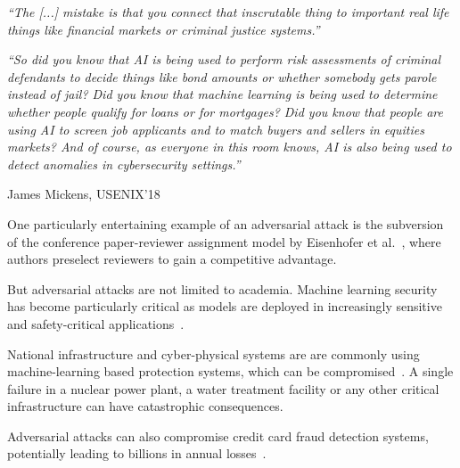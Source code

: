 \documentclass[a4paper, oneside]{discothesis}
\begin{document}
\begin{quotebox}
	\begin{flushright}
		\textit{``The [...] mistake is that you connect that inscrutable thing to important real life things like financial markets or criminal justice systems.''}
		\vspace{1em}

		\textit{``So did you know that AI is being used to perform risk assessments of criminal defendants to decide things like bond amounts or whether somebody gets parole instead of jail? Did you know that machine learning is being used to determine whether people qualify for loans or for mortgages? Did you know that people are using AI to screen job applicants and to match buyers and sellers in equities markets? And of course, as everyone in this room knows, AI is also being used to detect anomalies in cybersecurity settings.''}
		\vspace{1em}

		\textemdash{} James Mickens, USENIX'18~\cite{218395}
	\end{flushright}
\end{quotebox}

One particularly entertaining example of an adversarial attack is the subversion of the conference paper-reviewer assignment model by Eisenhofer et al.~\cite{eisenhofer2023no}, where authors preselect reviewers to gain a competitive advantage.

But adversarial attacks are not limited to academia. Machine learning security has become particularly critical as models are deployed in increasingly sensitive and safety-critical applications~\cite{10585001, ifci2023AnalysisOT, 9099439, Khadka2022ResilientML, yilmaz2021privacy, apruzzese2023real, kumar2020legal, Cao2020HateGANAG, Nurseitov2022ApplicationOM, Zolotukhin2022AttacksAM, huggingface2024security}.

National infrastructure and cyber-physical systems are are commonly using machine-learning based protection systems, which can be compromised~\cite{Moradpoor2023TheTO, Chevardin2023AnalysisOA, Ulybyshev2021TrustworthyDA, Halak2022TowardsAP, Rudolph2008DevelopingPS}. A single failure in a nuclear power plant, a water treatment facility or any other critical infrastructure can have catastrophic consequences.

Adversarial attacks can also compromise credit card fraud detection systems, potentially leading to billions in annual losses~\cite{Gu2022DeepLT, Agarwal2021BlackBoxAE, Tsai2024EffectiveAE}.
\end{document}
